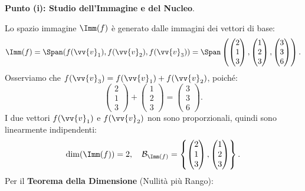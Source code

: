 \begin{dimostrazione}
\textbf{Punto (i): Studio dell'Immagine e del Nucleo}.

Lo spazio immagine $\Imm(f)$ è generato dalle immagini dei vettori di base:
\begin{equation}
    \Imm(f) = \Span(f(\vv{v}_1), f(\vv{v}_2), f(\vv{v}_3)) = \Span\left( \begin{pmatrix} 2 \\ 1 \\ 3 \end{pmatrix}, \begin{pmatrix} 1 \\ 2 \\ 3 \end{pmatrix}, \begin{pmatrix} 3 \\ 3 \\ 6 \end{pmatrix} \right).
\end{equation}
Osserviamo che $f(\vv{v}_3) = f(\vv{v}_1) + f(\vv{v}_2)$, poiché:
\begin{equation}
    \begin{pmatrix} 2 \\ 1 \\ 3 \end{pmatrix} + \begin{pmatrix} 1 \\ 2 \\ 3 \end{pmatrix} = \begin{pmatrix} 3 \\ 3 \\ 6 \end{pmatrix}.
\end{equation}
I due vettori $f(\vv{v}_1)$ e $f(\vv{v}_2)$ non sono proporzionali, quindi sono linearmente indipendenti:
\begin{equation}
    \dim(\Imm(f)) = 2, \quad \mathcal{B}_{\Imm(f)} = \left\{ \begin{pmatrix} 2 \\ 1 \\ 3 \end{pmatrix}, \begin{pmatrix} 1 \\ 2 \\ 3 \end{pmatrix} \right\}.
\end{equation}
Per il \textbf{Teorema della Dimensione} (Nullità più Rango):

\end{dimostrazione}
